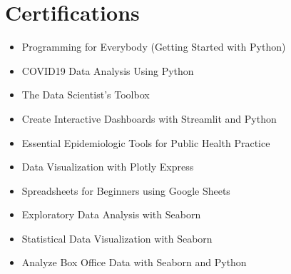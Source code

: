 \documentclass[11pt,a4paper,roman]{moderncv}
\begin{document}
{%
%      


\section{Certifications}
\begin{minipage}{\maincolumnwidth}%
	\small{
		\begin{itemize}
			\item Programming for Everybody (Getting Started with Python)
			\item COVID19 Data Analysis Using Python
			\item The Data Scientist’s Toolbox
			\item Create Interactive Dashboards with Streamlit and Python
			\item Essential Epidemiologic Tools for Public Health Practice
			\item Data Visualization with Plotly Express
			\item Spreadsheets for Beginners using Google Sheets
			\item Exploratory Data Analysis with Seaborn
			\item Statistical Data Visualization with Seaborn
			\item Analyze Box Office Data with Seaborn and Python
	\end{itemize}}%
\end{minipage}%

}




%
\end{document}
